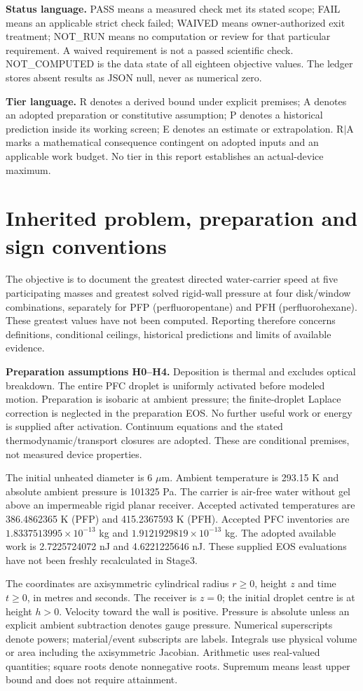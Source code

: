 \documentclass[10pt,a4paper]{article}
\newcommand{\nextsection}[1]{\clearpage\section{#1}}
\begin{document}
\textbf{Status language.} PASS means a measured check met its stated scope; FAIL means an applicable strict check failed; WAIVED means owner-authorized exit treatment; NOT\_RUN means no computation or review for that particular requirement. A waived requirement is not a passed scientific check. NOT\_COMPUTED is the data state of all eighteen objective values. The ledger stores absent results as JSON null, never as numerical zero.

\textbf{Tier language.} R denotes a derived bound under explicit premises; A denotes an adopted preparation or constitutive assumption; P denotes a historical prediction inside its working screen; E denotes an estimate or extrapolation. R$|$A marks a mathematical consequence contingent on adopted inputs and an applicable work budget. No tier in this report establishes an actual-device maximum.

\tableofcontents

\nextsection{Inherited problem, preparation and sign conventions}
The objective is to document the greatest directed water-carrier speed at five participating masses and greatest solved rigid-wall pressure at four disk/window combinations, separately for PFP (perfluoropentane) and PFH (perfluorohexane). These greatest values have not been computed. Reporting therefore concerns definitions, conditional ceilings, historical predictions and limits of available evidence.

\textbf{Preparation assumptions H0--H4.} Deposition is thermal and excludes optical breakdown. The entire PFC droplet is uniformly activated before modeled motion. Preparation is isobaric at ambient pressure; the finite-droplet Laplace correction is neglected in the preparation EOS. No further useful work or energy is supplied after activation. Continuum equations and the stated thermodynamic/transport closures are adopted. These are conditional premises, not measured device properties.

The initial unheated diameter is 6 $\mu$m. Ambient temperature is 293.15 K and absolute ambient pressure is 101325 Pa. The carrier is air-free water without gel above an impermeable rigid planar receiver. Accepted activated temperatures are 386.4862365 K (PFP) and 415.2367593 K (PFH). Accepted PFC inventories are $1.8337513995\times10^{-13}$ kg and $1.9121929819\times10^{-13}$ kg. The adopted available work is 2.7225724072 nJ and 4.6221225646 nJ. These supplied EOS evaluations have not been freshly recalculated in Stage3.

The coordinates are axisymmetric cylindrical radius $r\ge0$, height $z$ and time $t\ge0$, in metres and seconds. The receiver is $z=0$; the initial droplet centre is at height $h>0$. Velocity toward the wall is positive. Pressure is absolute unless an explicit ambient subtraction denotes gauge pressure. Numerical superscripts denote powers; material/event subscripts are labels. Integrals use physical volume or area including the axisymmetric Jacobian. Arithmetic uses real-valued quantities; square roots denote nonnegative roots. Supremum means least upper bound and does not require attainment.
\end{document}
